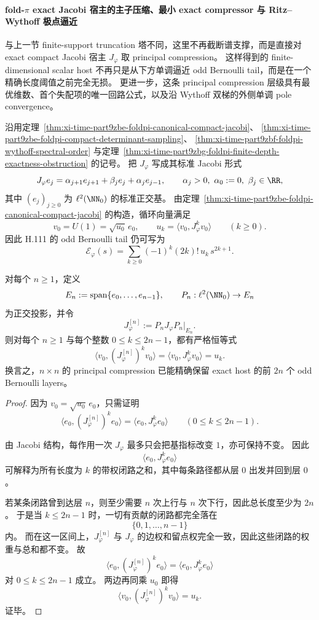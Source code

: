 \paragraph{fold-\texorpdfstring{$\pi$}{pi} exact Jacobi 宿主的主子压缩、最小 exact compressor 与 Ritz--Wythoff 极点逼近}
与上一节 finite-support truncation 塔不同，这里不再截断谱支撑，而是直接对 exact compact Jacobi 宿主 \(J_\varphi\) 取 principal compression。
这样得到的 finite-dimensional scalar host 不再只是从下方单调逼近 odd Bernoulli tail，而是在一个精确长度阈值之前完全无损。
更进一步，这条 principal compression 层级具有最优维数、首个失配项的唯一回路公式，以及沿 Wythoff 双梯的外侧单调 pole convergence。

沿用定理~\ref{thm:xi-time-part9zbe-foldpi-canonical-compact-jacobi}、
\ref{thm:xi-time-part9zbe-foldpi-compact-determinant-sampling}、
\ref{thm:xi-time-part9zbf-foldpi-wythoff-spectral-order}
与定理~\ref{thm:xi-time-part9zbg-foldpi-finite-depth-exactness-obstruction} 的记号。
把 \(J_\varphi\) 写成其标准 Jacobi 形式
\[
J_\varphi e_j=\alpha_{j+1}e_{j+1}+\beta_j e_j+\alpha_j e_{j-1},
\qquad
\alpha_j>0,\ \alpha_0:=0,\ \beta_j\in\RR,
\]
其中 \((e_j)_{j\ge 0}\) 为 \(\ell^2(\NN_0)\) 的标准正交基。
由定理~\ref{thm:xi-time-part9zbe-foldpi-canonical-compact-jacobi} 的构造，循环向量满足
\[
v_0=U(1)=\sqrt{u_0}\,e_0,
\qquad
u_k=\langle v_0,J_\varphi^k v_0\rangle
\qquad (k\ge 0).
\]
因此 H.111 的 odd Bernoulli tail 仍可写为
\[
\mathcal E_\varphi(s)
=
\sum_{k\ge 0}(-1)^k(2k)!\,u_k\,s^{2k+1}.
\]

\begin{theorem}\label{thm:xi-time-part9zbi-principal-compression-exact-moments}
对每个 \(n\ge 1\)，定义
\[
E_n:=\operatorname{span}\{e_0,\dots,e_{n-1}\},
\qquad
P_n:\ell^2(\NN_0)\to E_n
\]
为正交投影，并令
\[
J_\varphi^{[n]}:=P_nJ_\varphi P_n|_{E_n}.
\]
则对每个 \(n\ge 1\) 与每个整数 \(0\le k\le 2n-1\)，都有严格恒等式
\[
\langle v_0,(J_\varphi^{[n]})^k v_0\rangle
=
\langle v_0,J_\varphi^k v_0\rangle
=
u_k.
\]
换言之，\(n\times n\) 的 principal compression 已能精确保留 exact host 的前 \(2n\) 个 odd Bernoulli layers。
\end{theorem}
\begin{proof}
因为 \(v_0=\sqrt{u_0}\,e_0\)，只需证明
\[
\langle e_0,(J_\varphi^{[n]})^k e_0\rangle
=
\langle e_0,J_\varphi^k e_0\rangle
\qquad (0\le k\le 2n-1).
\]

由 Jacobi 结构，每作用一次 \(J_\varphi\) 最多只会把基指标改变 \(1\)，亦可保持不变。
因此
\[
\langle e_0,J_\varphi^k e_0\rangle
\]
可解释为所有长度为 \(k\) 的带权闭路之和，其中每条路径都从层 \(0\) 出发并回到层 \(0\)。

若某条闭路曾到达层 \(n\)，则至少需要 \(n\) 次上行与 \(n\) 次下行，因此总长度至少为 \(2n\)。
于是当 \(k\le 2n-1\) 时，一切有贡献的闭路都完全落在
\[
\{0,1,\dots,n-1\}
\]
内。
而在这一区间上，\(J_\varphi^{[n]}\) 与 \(J_\varphi\) 的边权和留点权完全一致，因此这些闭路的权重与总和都不变。
故
\[
\langle e_0,(J_\varphi^{[n]})^k e_0\rangle
=
\langle e_0,J_\varphi^k e_0\rangle
\]
对 \(0\le k\le 2n-1\) 成立。
两边再同乘 \(u_0\) 即得
\[
\langle v_0,(J_\varphi^{[n]})^k v_0\rangle=u_k.
\]
证毕。
\end{proof}


